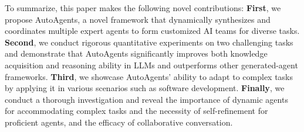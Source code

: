 To summarize, this paper makes the following novel contributions: 
 \textbf{First}, we propose AutoAgents, a novel framework that dynamically synthesizes and coordinates multiple expert agents to form customized AI teams for diverse tasks. \textbf{Second}, we conduct rigorous quantitative experiments on two challenging tasks and demonstrate that AutoAgents significantly improves both knowledge acquisition and reasoning ability in LLMs and outperforms other generated-agent frameworks. \textbf{Third}, we showcase AutoAgents’ ability to adapt to complex tasks by applying it in various scenarios such as software development. \textbf{Finally}, we conduct a thorough investigation and reveal the importance of dynamic agents for accommodating complex tasks and the necessity of self-refinement for proficient agents, and the efficacy of collaborative conversation.